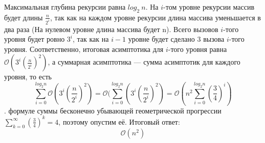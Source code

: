 \documentclass[a4paper,12pt]{article}
\begin{document}
Максимальная глубина рекурсии равна $log_2\ n$. На $i$-том уровне рекурсии массив будет длины $\frac{n}{2^i}$, так как на каждом уровне рекурсии длина массива уменьшается в два раза (На нулевом уровне длина массива будет n). Всего вызовов $i$-того уровня будет ровно $3^i$, так как на $i-1$ уровне будет сделано 3 вызова $i$-того уровня. Соответственно, итоговая асимптотика для $i$-того уровня равна $\mathcal{O}(3^i(\frac{n}{2^i})^2)$, а суммарная асимптотика --- сумма асимптотик для каждого уровня, то есть $$\sum\limits_{i=0}^{log_2 n} \mathcal{O}(3^i(\frac{n}{2^i})^2) = \mathcal{O}(\sum\limits_{i=0}^{log_2 n} (3^i(\frac{n}{2^i})^2) = \mathcal{O}(n^2\sum\limits_{i=0}^{log_2 n} (\frac{3}{4})^i)$$.  формуле суммы бесконечно убывающей геометрической прогрессии $\sum\limits_{k=0}^{\infty} (\frac{3}{4})^k = 4$, поэтому опустим её. Итоговый ответ:$$\mathcal{O}(n ^ 2)$$
\end{document}
